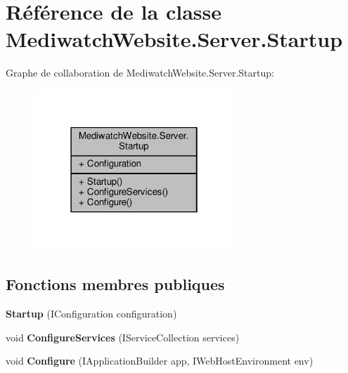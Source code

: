 \hypertarget{class_mediwatch_website_1_1_server_1_1_startup}{}\section{Référence de la classe Mediwatch\+Website.\+Server.\+Startup}
\label{class_mediwatch_website_1_1_server_1_1_startup}


Graphe de collaboration de Mediwatch\+Website.\+Server.\+Startup\+:\nopagebreak
\begin{figure}[H]
\begin{center}
\leavevmode
\includegraphics[width=214pt]{class_mediwatch_website_1_1_server_1_1_startup__coll__graph}
\end{center}
\end{figure}
\subsection*{Fonctions membres publiques}
\begin{DoxyCompactItemize}
\item 
\mbox{\label{class_mediwatch_website_1_1_server_1_1_startup_ad316a2daabb5739ffe24d385529a2fb7}} 
{\bfseries Startup} (I\+Configuration configuration)
\item 
\mbox{\label{class_mediwatch_website_1_1_server_1_1_startup_abbc6953beb2140feccf70e0ab6e4b12b}} 
void {\bfseries Configure\+Services} (I\+Service\+Collection services)
\item 
\mbox{\label{class_mediwatch_website_1_1_server_1_1_startup_adca78a113e96adf3237be1a5d92012c0}} 
void {\bfseries Configure} (I\+Application\+Builder app, I\+Web\+Host\+Environment env)
\end{DoxyCompactItemize}
